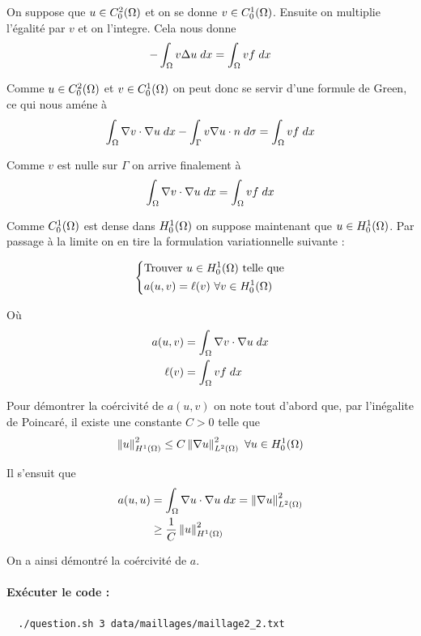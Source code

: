 \documentclass[french, 12pt, a4paper]{article}
\begin{document}
On suppose que $u \in C_0^2(\Omega)$ et on se donne $v \in C_0^1(\Omega)$.
Ensuite on multiplie l'égalité par $v$ et on l'integre. Cela nous donne
\[
-\int_\Omega v \Delta u \; dx = \int_\Omega vf \; dx
\]

Comme $u \in C_0^2(\Omega)$ et $v \in C_0^1(\Omega)$ on peut donc se
servir d'une formule de Green, ce qui nous améne à
\[
\int_\Omega \nabla v \cdot \nabla u \; dx
- \int_\Gamma v \nabla u \cdot n \; d\sigma = \int_\Omega vf \; dx
\]

Comme $v$ est nulle sur $\Gamma$ on arrive finalement à
\[
\int_\Omega \nabla v \cdot \nabla u \; dx = \int_\Omega vf \; dx
\]

Comme $C_0^1(\Omega)$ est dense dans $H_0^1(\Omega)$ on suppose maintenant
que $u \in H_0^1(\Omega)$. Par passage à la limite on en tire la formulation
variationnelle suivante :

\[
\begin{dcases}
\text{Trouver } u \in H_0^1(\ouvert) \text{ telle que} \\
a(u, v) = \ell(v) \forall v \in H_0^1(\ouvert)
\end{dcases}
\]

Où
\begin{align}
a(u, v) &= \int_\Omega \nabla v \cdot \nabla u \; dx \\
\ell(v) &= \int_\Omega vf \; dx
\end{align}

Pour démontrer la coércivité de $a(u, v)$ on note tout d'abord que, par l'inégalite
de Poincaré, il existe une constante $C > 0$ telle que
\[ \norme{u}^2_{H^1(\ouvert)} \le C \norme{\nabla u}^2_{L^2(\ouvert)}
   \forall u \in H_0^1(\ouvert) \]

Il s'ensuit que
\begin{align}
a(u, u) &= \int_\Omega \nabla u \cdot \nabla u \; dx = \left\Vert \nabla u\right\Vert^2_{L^2(\Omega)} \\
& \ge \frac{1}{C} \left\Vert u\right\Vert^2_{H^1(\Omega)}
\end{align}

On a ainsi démontré la coércivité de $a$.

\paragraph{Exécuter le code :}
\begin{verbatim}
  ./question.sh 3 data/maillages/maillage2_2.txt
\end{verbatim}
\end{document}

